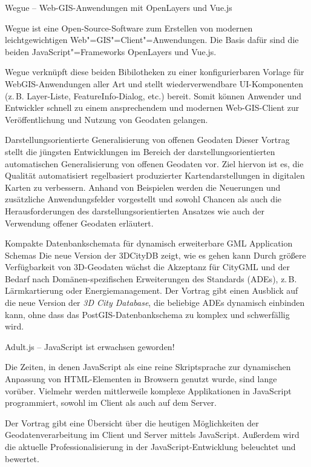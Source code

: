 %
{Wegue -- Web-GIS-Anwendungen mit OpenLayers und Vue.js}%
{}%
{%
Wegue ist eine Open-Source-Software zum Erstellen von modernen leichtgewichtigen
Web"=GIS"=Client"=Anwendungen. Die Basis dafür sind die beiden JavaScript"=Frameworks OpenLayers und
Vue.js.

Wegue verknüpft diese beiden Bibilotheken zu einer konfigurierbaren Vorlage für WebGIS-Anwendungen
aller Art und stellt wiederverwendbare UI-Komponenten (z.\,B. Layer-Liste, FeatureInfo-Dialog, etc.)
bereit. Somit können Anwender und Entwickler schnell zu einem ansprechendem und modernen
Web-GIS-Client zur Ver\-öf\-fent\-li\-chung und Nutzung von Geodaten gelangen.%
}

%
{Darstellungsorientierte Generalisierung von offenen Geodaten}%
{}%
{%
Dieser Vortrag stellt die jüngsten Entwicklungen im Bereich der darstellungsorientierten
automatischen Generalisierung von offenen Geodaten vor. Ziel hiervon ist es, die Qualität
automatisiert regelbasiert produzierter Kartendarstellungen in digitalen Karten zu verbessern.
Anhand von Beispielen werden die Neuerungen und zusätzliche Anwendungsfelder vorgestellt und sowohl
Chancen als auch die Herausforderungen des darstellungsorientierten Ansatzes wie auch der
Verwendung offener Geodaten erläutert.%
}



%
{Kompakte Datenbankschemata für \mbox{dynamisch} erweiterbare GML Application Schemas\vspace{0.3em}}%
{Die neue Version der 3DCityDB zeigt, wie es gehen kann}%
{%
Durch größere Verfügbarkeit von 3D-Geodaten wächst die Akzeptanz für CityGML und der Bedarf nach
Domänen-spezifischen Erweiterungen des Standards (ADEs), z.\,B. Lärmkartierung oder
Energiemanagement. Der Vortrag gibt einen Ausblick auf die neue Version der \emph{3D City Database}, die
beliebige ADEs dynamisch einbinden kann, ohne dass das PostGIS-Datenbankschema zu komplex und
schwerfällig wird.%
}

%
{Adult.js -- JavaScript ist erwachsen geworden!}%
{}%
{%
Die Zeiten, in denen JavaScript als eine reine Skriptsprache zur dynamischen Anpassung von HTML-Elementen
in Browsern genutzt wurde, sind lange vorüber. Vielmehr werden mittlerweile komplexe Applikationen in
Java\-Script programmiert, sowohl im Client als auch auf dem Server.

Der Vortrag gibt eine Übersicht über die heutigen Möglichkeiten der Geodatenverarbeitung im Client
und Server mittels JavaScript. Außerdem wird die aktuelle Professionalisierung in der
JavaScript-Entwicklung beleuchtet und bewertet.%
}

